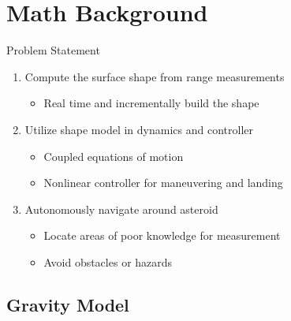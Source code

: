 \documentclass[11pt,professionalfonts,aspectratio=169]{beamer}
\begin{document}
\section[Problem Statement]{Math Background}
\begin{frame}{Problem Statement}
\begin{enumerate}
    \item<1-> Compute the surface shape from range measurements
        \begin{itemize}
            \item Real time and incrementally build the shape
        \end{itemize}
    \item<2-> Utilize shape model in dynamics and controller
        \begin{itemize}
            \item Coupled equations of motion 
            \item Nonlinear controller for maneuvering and landing
        \end{itemize}
    \item<3-> Autonomously navigate around asteroid 
        \begin{itemize}
            \item Locate areas of poor knowledge for measurement
            \item Avoid obstacles or hazards
        \end{itemize}
\end{enumerate}
\end{frame}

\subsection[Gravity Model]{Gravity Model}
\end{document}
